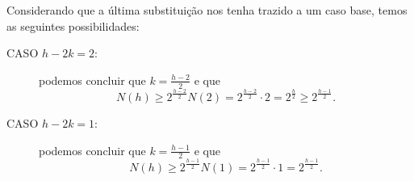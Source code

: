 \documentclass[10pt,a4paper,twoside]{article}
\theoremstyle{definition}
\begin{document}
     Considerando que a última substituição nos tenha trazido a um caso base, temos as seguintes possibilidades:

     \begin{description}
       \item[CASO \( h-2k = 2 \):] podemos concluir que \( k = \frac{h-2}{2} \) e que \[ N(h) \geq 2^{\frac{h-2}{2}} N(2) = 2^{\frac{h-2}{2}} \cdot 2 = 2^{\frac{h}{2}} \geq 2^{\frac{h-1}{2}}. \]
       \item[CASO \( h-2k = 1 \):] podemos concluir que \( k = \frac{h-1}{2} \) e que \[ N(h) \geq 2^{\frac{h-1}{2}} N(1) = 2^{\frac{h-1}{2}} \cdot 1 = 2^{\frac{h-1}{2}}. \]
     \end{description}

     \printbibliography
\end{document}
